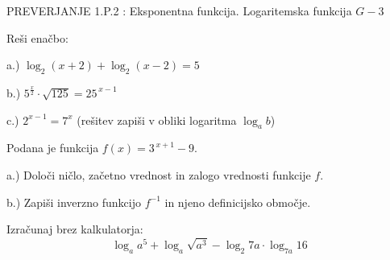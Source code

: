 \documentclass[a4paper,12pt]{letter}
\renewcommand{\headrulewidth}{3pt}
\renewcommand{\headrulewidth}{0.3pt}
\newcounter{tocke}
\begin{document}
\pagestyle{fancy}
\renewcommand\headrulewidth{0pt}
\lhead{}\chead{}\rhead{}
\rfoot{\vspace*{-2\baselineskip}}
\renewcommand{\vec}{\overrightarrow}
\everymath{\displaystyle}

\begin{minipage}{20cm}
\begin{bclogo}[couleur=brown!40,
  arrondi=0,ombre=true, couleurOmbre=gray!50,
logo =\bcplume,
  noborder=true]
{\textrm{{\Large{PREVERJANJE 1.P.2} \Huge{}:
\large{Eksponentna funkcija. Logaritemska funkcija} \hfill $G-3$}}}
\end{bclogo}
\end{minipage}
\begin{minipage}{20cm}
\end{minipage}


\def\tockeA{4+4+4}
\begin{naloga}[\hfill $\tockeA$] \addtocounter{tocke}{\numexpr\tockeA\relax}
Re\v{s}i ena\v{c}bo:

a.) $\log_2(x+2)+\log_2(x-2)=5$

b.) $5^{\frac{x}{2}}\cdot\sqrt{125}=25^{\,x-1}$

c.) $2^{x-1}=7^{x}$ \quad (re\v{s}itev zapi\v{s}i v obliki logaritma $\log_a b$)
\end{naloga}\newpage

\def\tockeB{2+1+1+3}
\begin{naloga}[\hfill $\tockeB$] \addtocounter{tocke}{\numexpr\tockeB\relax}
Podana je funkcija $f(x)=3^{\,x+1}-9$.

a.) Dolo\v{c}i ni\v{c}lo, za\v{c}etno vrednost in zalogo vrednosti funkcije $f$.

b.) Zapi\v{s}i inverzno funkcijo $f^{-1}$ in njeno definicijsko obmo\v{c}je.
\end{naloga}\newpage

\def\tockeC{4}
\begin{naloga}[\hfill $\tockeC$] \addtocounter{tocke}{\numexpr\tockeC\relax}
Izra\v{c}unaj brez kalkulatorja:
$$\log_a a^5+\log_a \sqrt{a^3}-\log_2 7a\cdot\log_{7a} 16$$
\end{naloga}\newpage
\end{document}
